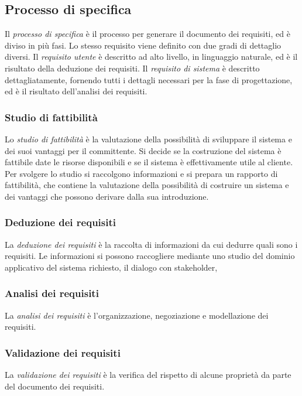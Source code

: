 \documentclass[11pt]{article}
\begin{document}
\subsection{Processo di specifica}
Il \textit{processo di specifica} è il processo per generare il documento dei requisiti, ed è diviso in più fasi.
Lo stesso requisito viene definito con due gradi di dettaglio diversi. Il \textit{requisito utente} è descritto ad alto 
livello, in linguaggio naturale, ed è il risultato della deduzione dei requisiti.
Il \textit{requisito di sistema} è descritto dettagliatamente, fornendo tutti i dettagli necessari per la fase di progettazione,
ed è il risultato dell'analisi dei requisiti.
\subsubsection*{Studio di fattibilità}
Lo \textit{studio di fattibilità} è la valutazione della possibilità di sviluppare il sistema e dei suoi vantaggi per 
il committente. Si decide se la costruzione del sistema è fattibile date le risorse disponibili e se il sistema è 
effettivamente utile al cliente.
Per svolgere lo studio si raccolgono informazioni e si prepara un rapporto di fattibilità, che contiene la valutazione 
della possibilità di costruire un sistema e dei vantaggi che possono derivare dalla sua introduzione.
\subsubsection*{Deduzione dei requisiti}
La \textit{deduzione dei requisiti} è la raccolta di informazioni da cui dedurre quali sono i requisiti.
Le informazioni si possono raccogliere mediante uno studio del dominio applicativo del sistema richiesto, il dialogo con 
stakeholder, 
\subsubsection*{Analisi dei requisiti}
La \textit{analisi dei requisiti} è l'organizzazione, negoziazione e modellazione dei requisiti.

\subsubsection*{Validazione dei requisiti}
La \textit{validazione dei requisiti} è la verifica del rispetto di alcune proprietà da parte del documento dei requisiti.
\end{document}
